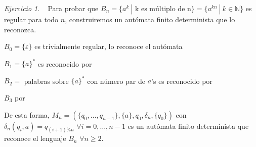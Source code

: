 \documentclass[12pt,spanish]{article}
\theoremstyle{definition}
\theoremstyle{remark}
\newtheorem{exercise}{Ejercicio}%
\begin{document}
\begin{exercise}~ Para probar que
  $B_n=\{a^k \ | \text{ k es múltiplo de n}\}=\{a^{kn} \ | \ k \in
  \mathbb{N}\}$ es regular para todo $n$, construiremos un autómata
  finito determinista que lo reconozca.

  $B_0=\{\varepsilon\}$ es trivialmente regular, lo reconoce el autómata \vspace{-5mm}
\begin{figure}[H]
  \centering
\end{figure} \vspace{-5mm}
$B_1=\{a\}^*$ es reconocido por \vspace{-7mm}
\begin{figure}[H]
  \centering
\end{figure}
$B_2=$ palabras sobre $\{a\}^*$ con número par de $a$'s es reconocido por
\begin{figure}[H]
  \centering
\end{figure}

$B_3$ por 
\begin{figure}[H]
  \centering
\end{figure}

De esta forma,
$M_n=(\{q_0,\ldots,q_{n-1}\},\{a\},q_0,\delta_n,\{q_0\})$ con
\\ $\delta_n(q_i,a)=q_{(i+1)\%n}$ $\forall i=0,\ldots,n-1$ es un
autómata finito determinista que reconoce el lenguaje $B_n$
$\forall n\geq 2$.

\end{exercise}
\end{document}
